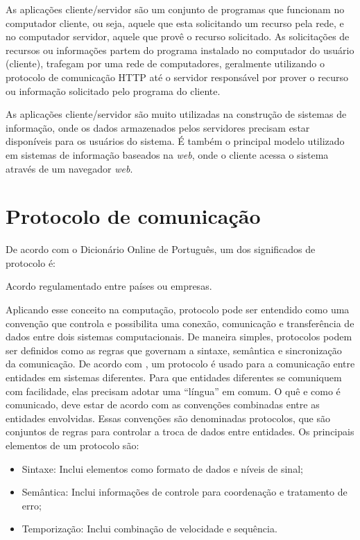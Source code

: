 As aplicações cliente/servidor são um conjunto de programas que funcionam no 
computador cliente, ou seja, aquele que esta solicitando um recurso pela rede, 
e no computador servidor, aquele que provê o recurso solicitado. As 
solicitações de recursos ou informações partem do programa instalado no 
computador do usuário (cliente), trafegam por uma rede de computadores, 
geralmente utilizando o protocolo de comunicação HTTP até o servidor 
responsável por prover o recurso ou informação solicitado pelo programa do 
cliente.

As aplicações cliente/servidor são muito utilizadas na construção de sistemas 
de informação, onde os dados armazenados pelos servidores precisam estar 
disponíveis para os usuários do sistema. É também o principal modelo utilizado 
em sistemas de informação baseados na \textit{web}, onde o cliente acessa o 
sistema através de um navegador \textit{web}.

\section{Protocolo de comunicação}

De acordo com o Dicionário Online de Português, um dos significados de 
protocolo é:

\begin{citacao}
Acordo regulamentado entre países ou empresas. \cite{dicionario}
\end{citacao}

Aplicando esse conceito na computação, protocolo pode ser entendido como uma 
convenção que controla e possibilita uma conexão, comunicação e transferência 
de dados entre dois sistemas computacionais. De maneira simples, protocolos 
podem ser definidos como as regras que governam a sintaxe, semântica e 
sincronização da comunicação. 
De acordo com , um protocolo é usado para a 
comunicação entre entidades em sistemas diferentes. Para que entidades 
diferentes se comuniquem com facilidade, elas precisam adotar uma ``língua'' em 
comum. O quê e como é comunicado, deve estar de acordo com as convenções 
combinadas entre as entidades envolvidas. Essas convenções são denominadas 
protocolos, que são conjuntos de regras para controlar a troca de 
dados entre entidades. Os principais elementos de um protocolo são:

\begin{itemize}
	\item Sintaxe: Inclui elementos como formato de dados e níveis de sinal;
	\item Semântica: Inclui informações de controle para coordenação e 
	tratamento de erro;
	\item Temporização: Inclui combinação de velocidade e sequência.
\end{itemize}

